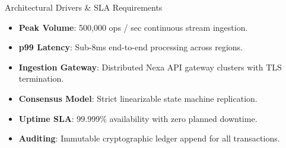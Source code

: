 \documentclass[
  style=simple,
  size=11pt,
  paper=screen,
  orient=landscape
]{powerdot}
\begin{document}
\begin{slide}{Architectural Drivers \& SLA Requirements}
\begin{minipage}{0.48\textwidth}
\begin{tcolorbox}[monobox,title=Throughput \& Latency SLAs]
\small
\begin{itemize}
  \item \textbf{Peak Volume}: 500,000 ops / sec continuous stream ingestion.
  \item \textbf{p99 Latency}: Sub-8ms end-to-end processing across regions.
  \item \textbf{Ingestion Gateway}: Distributed Nexa API gateway clusters with TLS termination.
\end{itemize}
\end{tcolorbox}
\end{minipage}%
\hfill
\begin{minipage}{0.48\textwidth}
\begin{tcolorbox}[monobox,title=Correctness \& Availability]
\small
\begin{itemize}
  \item \textbf{Consensus Model}: Strict linearizable state machine replication.
  \item \textbf{Uptime SLA}: 99.999\% availability with zero planned downtime.
  \item \textbf{Auditing}: Immutable cryptographic ledger append for all transactions.
\end{itemize}
\end{tcolorbox}
\end{minipage}
\end{slide}
\end{document}

